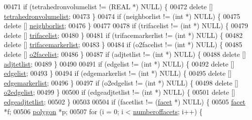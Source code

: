 \begin{DoxyCode}
00471     \textcolor{keywordflow}{if} (tetrahedronvolumelist != (REAL *) NULL) \{
00472       \textcolor{keyword}{delete} [] \hyperlink{classtetgenio_a1fe58bef7f029f7b84a8541851547382}{tetrahedronvolumelist};
00473     \}
00474     \textcolor{keywordflow}{if} (neighborlist != (\textcolor{keywordtype}{int} *) NULL) \{
00475       \textcolor{keyword}{delete} [] \hyperlink{classtetgenio_ab79a85fdffb1ab3f93ff3645fb604d40}{neighborlist};
00476     \}
00477 
00478     \textcolor{keywordflow}{if} (trifacelist != (\textcolor{keywordtype}{int} *) NULL) \{
00479       \textcolor{keyword}{delete} [] \hyperlink{classtetgenio_a25e290684bfb26d4d9b5e67059c572e2}{trifacelist};
00480     \}
00481     \textcolor{keywordflow}{if} (trifacemarkerlist != (\textcolor{keywordtype}{int} *) NULL) \{
00482       \textcolor{keyword}{delete} [] \hyperlink{classtetgenio_a22a2e0937d0da63a2fda26fc1671b32f}{trifacemarkerlist};
00483     \}
00484     \textcolor{keywordflow}{if} (o2facelist != (\textcolor{keywordtype}{int} *) NULL) \{
00485       \textcolor{keyword}{delete} [] \hyperlink{classtetgenio_aad1e2f66ad5c438fb2bee5d510fdca19}{o2facelist};
00486     \}
00487     \textcolor{keywordflow}{if} (adjtetlist != (\textcolor{keywordtype}{int} *) NULL) \{
00488       \textcolor{keyword}{delete} [] \hyperlink{classtetgenio_a44f7eb61256dfb95d2fa2bdb91ea3718}{adjtetlist};
00489     \}
00490 
00491     \textcolor{keywordflow}{if} (edgelist != (\textcolor{keywordtype}{int} *) NULL) \{
00492       \textcolor{keyword}{delete} [] \hyperlink{classtetgenio_ad4910159c1aa4dad3e66b24d8816f76c}{edgelist};
00493     \}
00494     \textcolor{keywordflow}{if} (edgemarkerlist != (\textcolor{keywordtype}{int} *) NULL) \{
00495       \textcolor{keyword}{delete} [] \hyperlink{classtetgenio_a35d12dcf3f3bb8e9304617da0e36d13f}{edgemarkerlist};
00496     \}
00497     \textcolor{keywordflow}{if} (o2edgelist != (\textcolor{keywordtype}{int} *) NULL) \{
00498       \textcolor{keyword}{delete} [] \hyperlink{classtetgenio_a0bf45168ac1af3d5b5ccaf8fe4cb13e3}{o2edgelist};
00499     \}
00500     \textcolor{keywordflow}{if} (edgeadjtetlist != (\textcolor{keywordtype}{int} *) NULL) \{
00501       \textcolor{keyword}{delete} [] \hyperlink{classtetgenio_ac1b0d2422e6da1fb08246f61e39bb352}{edgeadjtetlist};
00502     \}
00503 
00504     \textcolor{keywordflow}{if} (facetlist != (\hyperlink{structtetgenio_1_1facet}{facet} *) NULL) \{
00505       \hyperlink{structtetgenio_1_1facet}{facet} *f;
00506       \hyperlink{structtetgenio_1_1polygon}{polygon} *p;
00507       \textcolor{keywordflow}{for} (i = 0; i < \hyperlink{classtetgenio_af1cb1515751c9cd0497abba62da8790d}{numberoffacets}; i++) \{

\end{DoxyCode}
